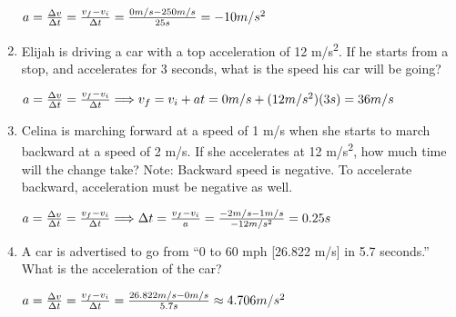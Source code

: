 \documentclass[letterpaper, 12pt]{article}
\begin{document}
\begin{enumerate}
		
	\color{red}
	\begin{center} $ a = \frac{\Delta v}{\Delta t } = \frac{v_f - v_i}{\Delta t} = \frac{0m/s-250m/s}{25s} = -10 m/s^2
		\vspace{0.15in} $
	\end{center}
	\color{black}
	
	


\item Elijah is driving a car with a top acceleration of 12 m/s\textsuperscript{2}.  If he starts from a stop, and accelerates for 3 seconds, what is the speed his car will be going?

		\vspace{0.15in}
		\color{red}
	\begin{center} $ a = \frac{\Delta v}{\Delta t } = \frac{v_f - v_i}{\Delta t} \Longrightarrow
		v_f = v_i + a t = 0 m/s + (12 m/s^2) (3s) = 36 m/s
		\vspace{0.15in} $
	\end{center}
	\color{black}
	

\item Celina is marching forward at a speed of 1 m/s when she starts to march backward at a speed of 2 m/s.  If she accelerates at 12 m/s\textsuperscript{2}, how much time will the change take? \color{red} Note: Backward speed is negative.  To accelerate backward, acceleration must be negative as well.

			
			\vspace{0.15in}
	\begin{center} $ a = \frac{\Delta v}{\Delta t } = \frac{v_f - v_i}{\Delta t} \Longrightarrow \Delta t = \frac{v_f - v_i}{a} = \frac{-2m/s-1m/s}{-12m/s^2} = 0.25s
		\vspace{0.15in} $
	\end{center}
	\color{black}



\item A car is advertised to go from “0 to 60 mph [26.822 m/s] in 5.7 seconds.”  What is the acceleration of the car?

	\color{red}
	\begin{center} $ a = \frac{\Delta v}{\Delta t } = \frac{v_f - v_i}{\Delta t} = \frac{26.822m/s-0m/s}{5.7s} \approx 4.706 m/s^2
	\vspace{0.15in} $
	\end{center}
	\color{black}






	
\end{enumerate}
 
\end{document}
